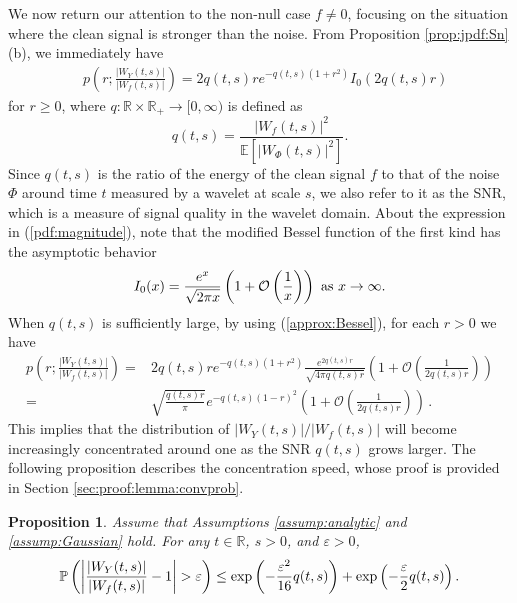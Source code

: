 \documentclass{amsart}
\newtheorem{Proposition}{Proposition}
\begin{document}
We now return our attention to the non-null case $f\neq0$, focusing on the situation where the clean signal is stronger than the noise. From Proposition \ref{prop:jpdf:Sn}(b), we immediately have
\begin{align}\label{pdf:magnitude}
&p\left(r;\frac{|W_{Y}(t,s)|}{|W_{f}(t,s)|}\right)
=
2q(t,s)re^{-q(t,s)(1+r^2)}
I_{0}\left(2q(t,s)r\right)
\end{align}
for $r\geq0$, where  $q:\mathbb{R}\times  \mathbb{R}_{+} \rightarrow [0,\infty)$ is defined as
\begin{equation}\label{def:SNR}
q(t,s)=\frac{|W_{f}(t,s)|^2}{\mathbb{E}[|W_{\Phi}(t,s)|^2]}.
\end{equation}
Since $q(t,s)$ is the ratio of the energy of the clean signal $f$ to that of the noise $\Phi$ around time $t$
measured by a wavelet at scale $s$,  we also refer to it as the SNR, which is a measure of signal quality in the wavelet domain.
About the expression in (\ref{pdf:magnitude}), note that the modified Bessel function of the first kind has the asymptotic behavior
\begin{align}\label{approx:Bessel}
I_{0}(x) = \frac{e^{x}}{\sqrt{2\pi x}}\left(1+\mathcal{O}\left(\frac{1}{x}\right)\right)\ \textup{as}\ x\rightarrow\infty.
\end{align}
When $q(t,s)$ is sufficiently large, by using (\ref{approx:Bessel}), for each $r>0$ we have
\begin{align*}
p\left(r;\frac{|W_{Y}(t,s)|}{|W_{f}(t,s)|}\right)
=&
2q(t,s)r e^{-q(t,s)(1+r^2)}
 \frac{e^{2q(t,s)r}}{\sqrt{4\pi q(t,s)r}}\left(1+\mathcal{O}\left(\frac{1}{2q(t,s)r}\right)\right)
\\=&\sqrt{\frac{q(t,s)r}{\pi}}e^{-q(t,s)\left(1-r\right)^{2}}\left(1+\mathcal{O}\left(\frac{1}{2q(t,s)r}\right)\right)\,.
\end{align*}
This implies that the distribution of $|W_{Y}(t,s)|/|W_{f}(t,s)|$ will become increasingly concentrated around one as the SNR $q(t,s)$ grows larger.
The following proposition describes the concentration speed, whose proof is provided in Section \ref{sec:proof:lemma:convprob}.


\begin{Proposition}\label{lemma:convprob}
Assume that Assumptions \ref{assump:analytic} and \ref{assump:Gaussian} hold.
For any $t\in \mathbb{R}$, $s>0$, and $\varepsilon>0$,
\begin{align*}%
\mathbb{P}\left(\left|\frac{|W_{Y}(t,s)|}{|W_{f}(t,s)|}-1\right|>\varepsilon\right)
\leq\textup{exp}\left(-\frac{\varepsilon^{2}}{16}q(t,s)\right)
+\textup{exp}\left(-\frac{\varepsilon}{2}q(t,s)\right).
\end{align*}
\end{Proposition}
\end{document}
